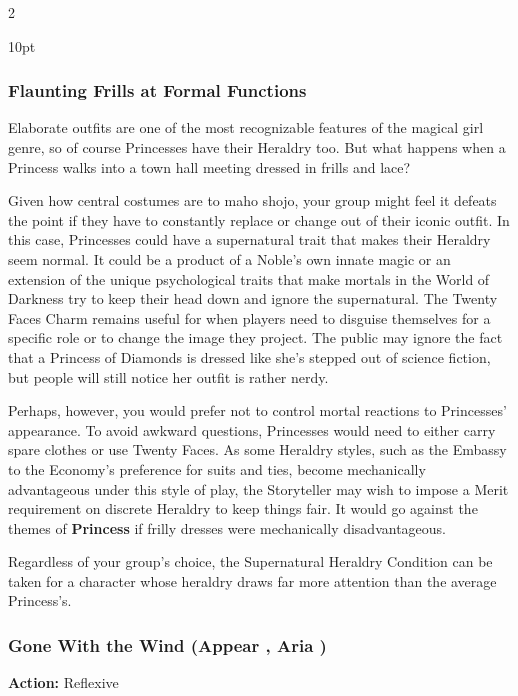 \begin{multicols}{2}
\begin{myindentpar}{10pt}
\end{myindentpar}

\bigsidebarstart

\subsubsection*{Flaunting Frills at Formal Functions}
 
Elaborate outfits are one of the most recognizable features of the magical girl genre, so of course Princesses have their Heraldry too. But what happens when a Princess walks into a town hall meeting dressed in frills and lace? 
  
Given how central costumes are to maho shojo, your group might feel it defeats the point if they have to constantly replace or change out of their iconic outfit. In this case, Princesses could have a supernatural trait that makes their Heraldry seem normal. It could be a product of a Noble's own innate magic or an extension of the unique psychological traits that make mortals in the World of Darkness try to keep their head down and ignore the supernatural. The Twenty Faces Charm remains useful for when players need to disguise themselves for a specific role or to change the image they project. The public may ignore the fact that a Princess of Diamonds is dressed like she's stepped out of science fiction, but people will still notice her outfit is rather nerdy. 
  
Perhaps, however, you would prefer not to control mortal reactions to Princesses' appearance. To avoid awkward questions, Princesses would need to either carry spare clothes or use Twenty Faces. As some Heraldry styles, such as the Embassy to the Economy's preference for suits and ties, become mechanically advantageous under this style of play, the Storyteller may wish to impose a Merit requirement on discrete Heraldry to keep things fair. It would go against the themes of \textbf{Princess} if frilly dresses were mechanically disadvantageous. 
  
Regardless of your group's choice, the Supernatural Heraldry Condition can be taken for a character whose heraldry draws far more attention than the average Princess's.
 
\bigsidebarend

\subsubsection*{Gone With the Wind (Appear \textbullet, Aria \textbullet )}
\noindent \textbf{Action:} Reflexive


\end{multicols}
